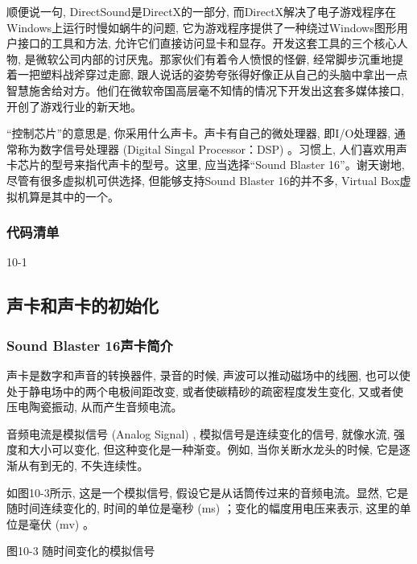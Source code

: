 \documentclass[12pt]{article}
\begin{document}
\begin{CJK}{UTF8}{gbsn}
顺便说一句, DirectSound是DirectX的一部分, 而DirectX解决了电子游戏程序在Windows上运行时慢如蜗牛的问题, 它为游戏程序提供了一种绕过Windows图形用户接口的工具和方法, 允许它们直接访问显卡和显存。开发这套工具的三个核心人物, 是微软公司内部的讨厌鬼。那家伙们有着令人愤恨的怪僻, 经常脚步沉重地提着一把塑料战斧穿过走廊, 跟人说话的姿势夸张得好像正从自己的头脑中拿出一点智慧施舍给对方。他们在微软帝国高层毫不知情的情况下开发出这套多媒体接口, 开创了游戏行业的新天地。

“控制芯片”的意思是, 你采用什么声卡。声卡有自己的微处理器, 即I/O处理器, 通常称为数字信号处理器 (Digital Singal Processor：DSP) 。习惯上, 人们喜欢用声卡芯片的型号来指代声卡的型号。这里, 应当选择“Sound Blaster 16”。谢天谢地, 尽管有很多虚拟机可供选择, 但能够支持Sound Blaster 16的并不多, Virtual Box虚拟机算是其中的一个。

\subsubsection{代码清单}
%
%

10-1
%

\subsection{声卡和声卡的初始化}
\subsubsection{Sound Blaster 16声卡简介}
声卡是数字和声音的转换器件, 录音的时候, 声波可以推动磁场中的线圈, 也可以使处于静电场中的两个电极间距改变, 或者使碳精砂的疏密程度发生变化, 又或者使压电陶瓷振动, 从而产生音频电流。

音频电流是模拟信号 (Analog Signal) , 模拟信号是连续变化的信号, 就像水流, 强度和大小可以变化, 但这种变化是一种渐变。例如, 当你关断水龙头的时候, 它是逐渐从有到无的, 不失连续性。

如图10-3所示, 这是一个模拟信号, 假设它是从话筒传过来的音频电流。显然, 它是随时间连续变化的, 时间的单位是毫秒 (ms) ；变化的幅度用电压来表示, 这里的单位是毫伏 (mv) 。
 
图10-3  随时间变化的模拟信号


\end{CJK}
\end{document}
